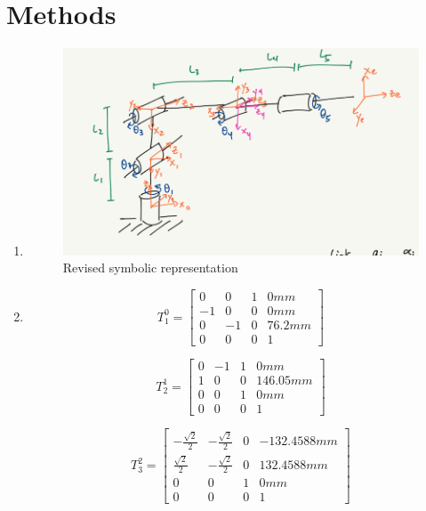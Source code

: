 \documentclass[12pt]{article}
\begin{document}
\section{Methods}
\begin{enumerate}
\item \begin{figure}
	\centering 
	\includegraphics[scale=1]{Q1.png}
	\caption{Revised symbolic representation}
	\end{figure}
\item 
\begin{equation}
	T^{0}_{1} = \begin{bmatrix}
	0 & 0 & 1 & 0mm\\
	-1 & 0 & 0 & 0mm\\
	0 & -1 & 0 & 76.2mm\\
	0 & 0 & 0 & 1
	\end{bmatrix}
\end{equation}

\begin{equation}	
	T^{1}_{2} = \begin{bmatrix}
	0 & -1 & 1 & 0mm\\
	1 & 0 & 0 & 146.05mm\\
	0 & 0 & 1 & 0mm\\
	0 & 0 & 0 & 1
	\end{bmatrix}
\end{equation}

\begin{equation}	
	T^{2}_{3} = \begin{bmatrix}
	-\frac{\sqrt{2}}{2} & -\frac{\sqrt{2}}{2} & 0 & -132.4588mm\\
	\frac{\sqrt{2}}{2} & -\frac{\sqrt{2}}{2} & 0 & 132.4588mm\\
	0 & 0 & 1 & 0mm\\
	0 & 0 & 0 & 1
	\end{bmatrix}
\end{equation}


\end{enumerate}
\end{document}
